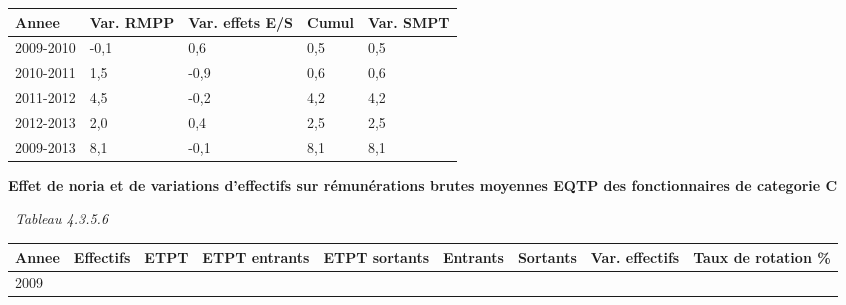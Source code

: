 \begin{longtable}[]{@{}lllll@{}}
\toprule
Annee & Var. RMPP & Var. effets E/S & Cumul & Var. SMPT\tabularnewline
\midrule
\endhead
2009-2010 & -0,1 & 0,6 & 0,5 & 0,5\tabularnewline
2010-2011 & 1,5 & -0,9 & 0,6 & 0,6\tabularnewline
2011-2012 & 4,5 & -0,2 & 4,2 & 4,2\tabularnewline
2012-2013 & 2,0 & 0,4 & 2,5 & 2,5\tabularnewline
2009-2013 & 8,1 & -0,1 & 8,1 & 8,1\tabularnewline
\bottomrule
\end{longtable}

\textbf{Effet de noria et de variations d'effectifs sur rémunérations
brutes moyennes EQTP des fonctionnaires de categorie C}

~\emph{Tableau 4.3.5.6}

\begin{longtable}[]{@{}lllllllll@{}}
\toprule
\begin{minipage}[b]{0.05\columnwidth}\raggedright
Annee\strut
\end{minipage} & \begin{minipage}[b]{0.08\columnwidth}\raggedright
Effectifs\strut
\end{minipage} & \begin{minipage}[b]{0.05\columnwidth}\raggedright
ETPT\strut
\end{minipage} & \begin{minipage}[b]{0.10\columnwidth}\raggedright
ETPT entrants\strut
\end{minipage} & \begin{minipage}[b]{0.10\columnwidth}\raggedright
ETPT sortants\strut
\end{minipage} & \begin{minipage}[b]{0.07\columnwidth}\raggedright
Entrants\strut
\end{minipage} & \begin{minipage}[b]{0.07\columnwidth}\raggedright
Sortants\strut
\end{minipage} & \begin{minipage}[b]{0.11\columnwidth}\raggedright
Var. effectifs\strut
\end{minipage} & \begin{minipage}[b]{0.14\columnwidth}\raggedright
Taux de rotation \%\strut
\end{minipage}\tabularnewline
\midrule
\endhead
\begin{minipage}[t]{0.05\columnwidth}\raggedright
2009\strut
\end{minipage} & \begin{minipage}[t]{0.08\columnwidth}\raggedright

\end{minipage}
\end{longtable}
